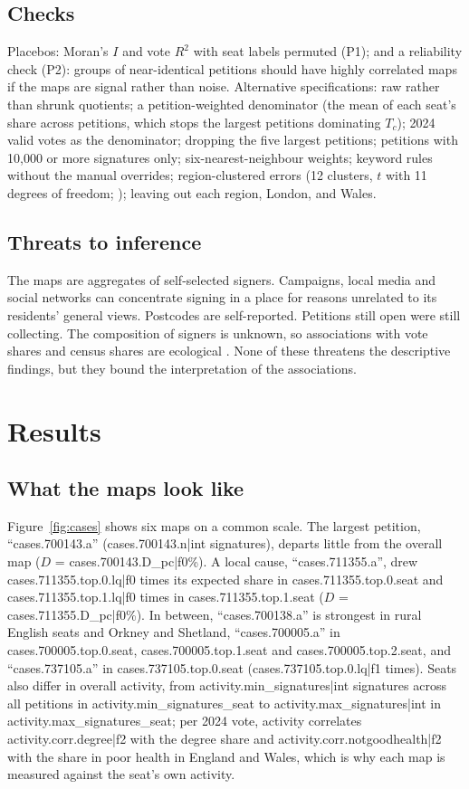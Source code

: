 \documentclass[11pt,a4paper]{article}
\begin{document}
\subsection{Checks}
Placebos: Moran's $I$ and vote $R^2$ with seat labels permuted (P1); and a reliability check (P2): groups of near-identical petitions should have highly correlated maps if the maps are signal rather than noise. Alternative specifications: raw rather than shrunk quotients; a petition-weighted denominator (the mean of each seat's share across petitions, which stops the largest petitions dominating $T_c$); 2024 valid votes as the denominator; dropping the five largest petitions; petitions with 10,000 or more signatures only; six-nearest-neighbour weights; keyword rules without the manual overrides; region-clustered errors (12 clusters, $t$ with 11 degrees of freedom; \citealt{cameronmiller2015}); leaving out each region, London, and Wales.

\subsection{Threats to inference}
The maps are aggregates of self-selected signers. Campaigns, local media and social networks can concentrate signing in a place for reasons unrelated to its residents' general views. Postcodes are self-reported. Petitions still open were still collecting. The composition of signers is unknown, so associations with vote shares and census shares are ecological \citep{robinson1950}. None of these threatens the descriptive findings, but they bound the interpretation of the associations.

\section{Results}\label{sec:results}
\subsection{What the maps look like}
Figure~\ref{fig:cases} shows six maps on a common scale. The largest petition, ``{{cases.700143.a}}'' ({{cases.700143.n|int}} signatures), departs little from the overall map ($D$ = {{cases.700143.D_pc|f0}}\%). A local cause, ``{{cases.711355.a}}'', drew {{cases.711355.top.0.lq|f0}} times its expected share in {{cases.711355.top.0.seat}} and {{cases.711355.top.1.lq|f0}} times in {{cases.711355.top.1.seat}} ($D$ = {{cases.711355.D_pc|f0}}\%). In between, ``{{cases.700138.a}}'' is strongest in rural English seats and Orkney and Shetland, ``{{cases.700005.a}}'' in {{cases.700005.top.0.seat}}, {{cases.700005.top.1.seat}} and {{cases.700005.top.2.seat}}, and ``{{cases.737105.a}}'' in {{cases.737105.top.0.seat}} ({{cases.737105.top.0.lq|f1}} times). Seats also differ in overall activity, from {{activity.min_signatures|int}} signatures across all petitions in {{activity.min_signatures_seat}} to {{activity.max_signatures|int}} in {{activity.max_signatures_seat}}; per 2024 vote, activity correlates {{activity.corr.degree|f2}} with the degree share and {{activity.corr.notgoodhealth|f2}} with the share in poor health in England and Wales, which is why each map is measured against the seat's own activity.
\end{document}
